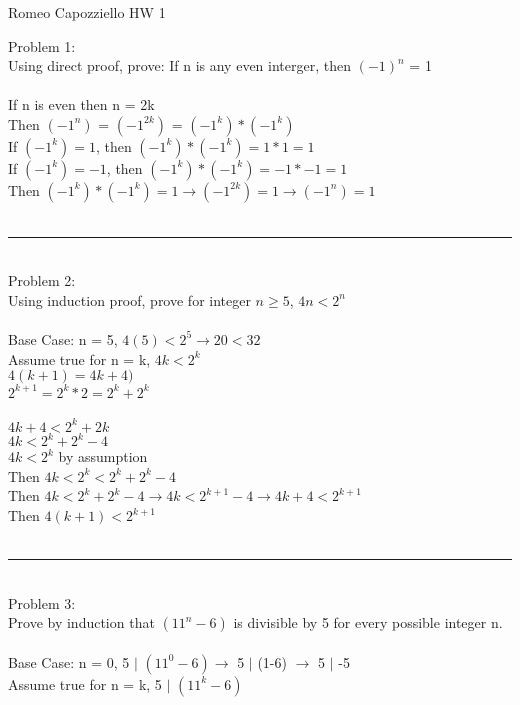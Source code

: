 \documentclass{article}
\begin{document}
    \begin{center}
        Romeo Capozziello HW 1
    \end{center}
    Problem 1: \\ 
    Using direct proof, prove: If n is any even interger, then $(-1)^n$ = 1\\
    \\
    If n is even then n = 2k\\
    Then $(-1^n)$ = $(-1^{2k})$ = $(-1^k) * (-1^k)$\\
    If $(-1^k) = 1$, then $(-1^k) * (-1^k) = 1 * 1 = 1$ \\
    If $(-1^k) = -1$, then $(-1^k) * (-1^k) = -1 * -1 = 1$ \\
    Then $(-1^k) * (-1^k) = 1 \rightarrow (-1^{2k}) = 1 \rightarrow (-1^n) = 1$\\
    \\
    \rule{\textwidth}{0.5pt}\\
    Problem 2: \\
    Using induction proof, prove for integer $n \geq 5$, $4n < 2^n$\\
    \\
    Base Case: n = 5, $4(5) < 2^5 \rightarrow 20 < 32$\\
    Assume true for n = k, $4k < 2^k$\\
    $4(k+1) = 4k + 4)$\\
    $2^{k+1} = 2^k*2 = 2^k + 2^k$\\\\
    $4k + 4 < 2^k + 2k$\\
    $4k < 2^k + 2^k - 4$\\
    $4k < 2^k$ by assumption\\
    Then $4k < 2^k < 2^k + 2^k - 4$\\
    Then $4k < 2^k + 2^k - 4 \rightarrow 4k < 2^{k+1} - 4 \rightarrow 4k + 4 < 2^{k+1}$\\
    Then $4(k+1) < 2^{k+1}$\\
    \\
    \rule{\textwidth}{0.5pt}\\
    Problem 3: \\
    Prove by induction that $(11^n - 6)$ is divisible by 5 for every possible integer n.\\
    \\
    Base Case: n = 0, 5 $|$ $(11^0 - 6) \rightarrow$ 5 $|$ (1-6) $\rightarrow$ 5 $|$ -5\\
    Assume true for n = k, 5 $|$ $(11^k - 6)$\\\\
\end{document}
